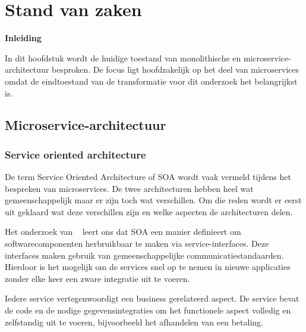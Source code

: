 \label{ch:stand-van-zaken}
\graphicspath{{./img/}}

\chapter{Stand van zaken}
\textbf{Inleiding}

In dit hoofdstuk wordt de huidige toestand van monolithische en microservice-architectuur besproken. De focus ligt hoofdzakelijk op het deel van microservices omdat de eindtoestand van de transformatie voor dit onderzoek het belangrijkst is.

\section{Microservice-architectuur}

\subsection{Service oriented architecture}
De term Service Oriented Architecture of SOA wordt vaak vermeld tijdens het bespreken van microservices. De twee architecturen hebben heel wat gemeenschappelijk maar er zijn toch wat verschillen. Om die reden wordt er eerst uit geklaard wat deze verschillen zijn en welke aspecten de architecturen delen. 

Het onderzoek van ~\autocite{Schaik2014} leert ons dat SOA een manier definieert om softwarecomponenten herbruikbaar te maken via service-interfaces. Deze interfaces maken gebruik van gemeenschappelijke communicatiestandaarden. Hierdoor is het mogelijk om de services snel op te nemen in nieuwe applicaties zonder elke keer een zware integratie uit te voeren. 

Iedere service vertegenwoordigt een business gerelateerd aspect. De service bevat de code en de nodige gegevensintegraties om het functionele aspect volledig en zelfstandig uit te voeren, bijvoorbeeld het afhandelen van een betaling.\\

